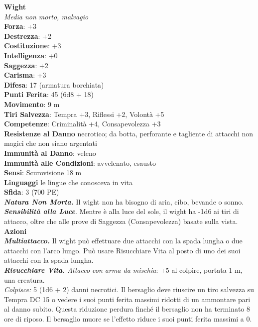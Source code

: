 \begin{multicols}{2}
\medskip\textbf{Wight}\\
\emph{Media non morto, malvagio}\\
\textbf{Forza}: +3\\
\textbf{Destrezza}: +2\\
\textbf{Costituzione}: +3\\
\textbf{Intelligenza}: +0\\
\textbf{Saggezza}: +2\\
\textbf{Carisma}: +3\\
\textbf{Difesa}: 17 (armatura borchiata)\\
\textbf{Punti Ferita}: 45 (6d8 + 18)\\
\textbf{Movimento}: 9 m\\
\textbf{Tiri Salvezza}: Tempra +3, Riflessi +2, Volontà +5\\
\textbf{Competenze}: Criminalità +4, Consapevolezza +3\\
\textbf{Resistenze al Danno} necrotico; da botta, perforante e tagliente di attacchi non magici che non siano argentati \\
\textbf{Immunità al Danno}: veleno\\
\textbf{Immunità alle Condizioni}: avvelenato, esausto\\
\textbf{Sensi}: Scurovisione 18 m\\
\textbf{Linguaggi} le lingue che conosceva in vita\\
\textbf{Sfida}: 3 (700 PE)\smallskip\\
\emph{\textbf{Natura Non Morta.}} Il wight non ha bisogno di aria, cibo, bevande o sonno.\\
\emph{\textbf{Sensibilità alla Luce}}. Mentre è alla luce del sole, il wight ha -1d6 ai tiri di attacco, oltre che alle prove di Saggezza (Consapevolezza) basate sulla vista.\\
\smallskip\textbf{Azioni}\\
\emph{\textbf{Multiattacco.}} Il wight può effettuare due attacchi con la spada lungha o due attacchi con l'arco lungo. Può usare Risucchiare Vita al posto di uno dei suoi attacchi con la spada lungha.\\
\emph{\textbf{Risucchiare Vita.} Attacco con arma da mischia}: +5 al colpire, portata 1 m, una creatura.\\
\emph{Colpisce:} 5 (1d6 + 2) danni necrotici. Il bersaglio deve riuscire un tiro salvezza su Tempra DC  15 o vedere i suoi punti ferita massimi ridotti di un ammontare pari al danno subito. Questa riduzione perdura finché il bersaglio non ha terminato 8 ore di riposo. Il bersaglio muore se l'effetto riduce i suoi punti ferita massimi a 0.\\


\end{multicols}
